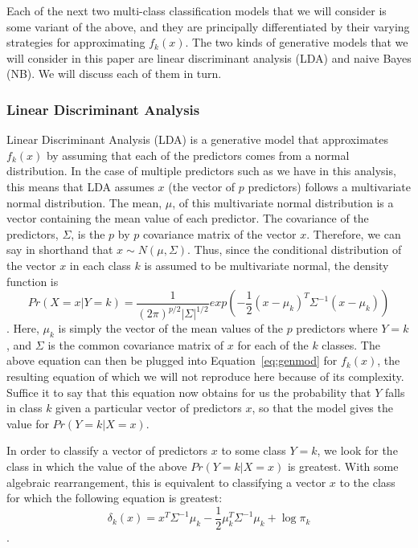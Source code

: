 \documentclass[12pt]{article}
\begin{document}
Each of the next two multi-class classification models that we will consider is some 
variant of the above, and they are principally differentiated by their varying strategies 
for approximating $f_k(x)$.  The two kinds of generative models that we will consider in 
this paper are linear discriminant analysis (LDA) and naive Bayes (NB).  We will discuss 
each of them in turn.  

\subsubsection{Linear Discriminant Analysis}
\label{sec:lda}

Linear Discriminant Analysis (LDA) is a generative model that approximates $f_k(x)$ by 
assuming that each of the predictors comes from a normal distribution.  In the case of 
multiple predictors such as we have in this analysis, this means that LDA assumes $x$ 
(the vector of $p$ predictors) follows a multivariate normal distribution.  The mean, 
$\mu$, of this multivariate normal distribution is a vector containing the mean value 
of each predictor.  The covariance of the predictors, $\Sigma$, is the $p$ by $p$ 
covariance matrix of the vector $x$.  Therefore, we can say in shorthand that 
$x \sim N(\mu,\Sigma)$.  Thus, since the conditional distribution of the vector $x$ in 
each class $k$ is assumed to be multivariate normal, the density function is 
$$Pr(X = x|Y = k) = \frac {1} {(2\pi) ^ {p/2} |\Sigma| ^ {1/2}} exp(-\frac{1}{2} 
(x - \mu_k) ^ T \Sigma ^ {-1} (x - \mu_k))$$ \citep{james2021introduction}.  Here, 
$\mu_k$ is simply the vector of the mean values of the $p$ predictors where $Y = k$, 
and $\Sigma$ is the common covariance matrix of $x$ for each of the $k$ classes.  The 
above equation can then be plugged into Equation~\eqref{eq:genmod} for $f_k(x)$, the 
resulting equation of which we will not reproduce here because of its complexity.  
Suffice it to say that this equation now obtains for us the probability that $Y$ falls 
in class $k$ given a particular vector of predictors $x$, so that the model gives the 
value for $Pr(Y = k|X = x)$.

In order to classify a vector of predictors $x$ to some class $Y = k$, we look for the 
class in which the value of the above $Pr(Y = k|X = x)$ is greatest.  With some algebraic 
rearrangement, this is equivalent to classifying a vector $x$ to the class for which the 
following equation is greatest:
\begin{equation}
  \label{eq:disscore}
  \delta_k(x) = x ^ T \Sigma ^ {-1} \mu_k - 
  \frac {1} {2} \mu_k ^ T \Sigma ^ {-1} \mu_k + \log {\pi_k}
\end{equation}. 
\end{document}
